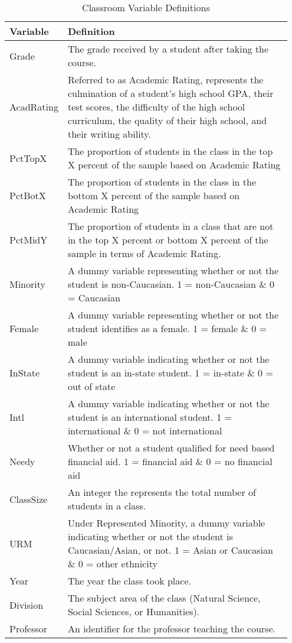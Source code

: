 \begin{table}[htb]
\centering
\caption{Classroom Variable Definitions}\label{tab:def1}
 \begin{tabular}{p{0.15\linewidth}|p{0.8\linewidth}} 
 \hline\hline
 Variable & Definition \\ [0.5ex] 
 \hline\hline
Grade & The grade received by a student after taking the course. \\ 
 \hline
 AcadRating & Referred to as Academic Rating, represents the culmination of a student's high school GPA, their test scores, the difficulty of the high school curriculum, the quality of their high school, and their writing ability. \\
 \hline
 PctTopX & The proportion of students in the class in the top X percent of the sample based on Academic Rating \\
 \hline
 PctBotX & The proportion of students in the class in the bottom X percent of the sample based on Academic Rating \\
 \hline
 PctMidY & The proportion of students in a class that are not in the top X percent or bottom X percent of the sample in terms of Academic Rating. \\
 \hline
 Minority & A dummy variable representing whether or not the student is non-Caucasian. 1 = non-Caucasian \& 0 = Caucasian\\
 \hline
 Female & A dummy variable representing whether or not the student identifies as a female. 1 = female \& 0 = male\\
 \hline
 InState & A dummy variable indicating whether or not the student is an in-state student.  1 = in-state \& 0 = out of state\\
 \hline
 Intl & A dummy variable indicating whether or not the student is an international student.  1 = international \& 0 = not international\\
 \hline
 Needy & Whether or not a student qualified for need based financial aid.  1 = financial aid \& 0 = no financial aid\\
 \hline
 ClassSize & An integer the represents the total number of students in a class. \\
 \hline
 URM & Under Represented Minority, a dummy variable indicating whether or not the student is Caucasian/Asian, or not.  1 = Asian or Caucasian \& 0 = other ethnicity \\
 \hline
 Year & The year the class took place. \\
 \hline
 Division & The subject area of the class (Natural Science, Social Sciences, or Humanities). \\
 \hline
 Professor & An identifier for the professor teaching the course. \\
[1ex] 
 \hline\hline
\end{tabular}
\end{table}

